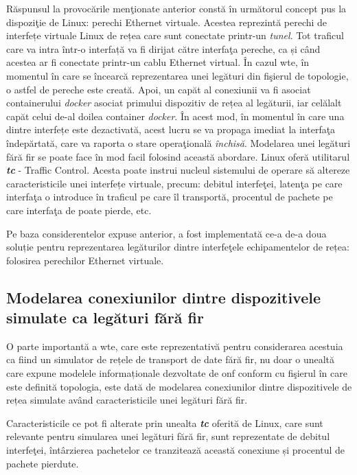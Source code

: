 Răspunsul la provocările menţionate anterior constă în următorul concept pus la dispoziţie de Linux: perechi Ethernet virtuale. Acestea reprezintă perechi de interfețe virtuale Linux de rețea care sunt conectate printr-un \textit{tunel}. Tot traficul care va intra într-o interfață va fi dirijat către interfaţa pereche, ca și când acestea ar fi conectate printr-un cablu Ethernet virtual. În cazul \gls{wte}, în momentul în care se încearcă reprezentarea unei legături din fişierul de topologie, o astfel de pereche este creată. Apoi, un capăt al conexiunii va fi asociat containerului \textit{docker} asociat primului dispozitiv de rețea al legăturii, iar celălalt capăt celui de-al doilea container \textit{docker}. În acest mod, în momentul în care una dintre interfețe este dezactivată, acest lucru se va propaga imediat la interfaţa îndepărtată, care va raporta o stare operaţională \textit{închisă}. Modelarea unei legături fără fir se poate face în mod facil folosind această abordare. Linux oferă utilitarul \textit{\textbf{tc}} - Traffic Control. Acesta poate instrui nucleul sistemului de operare să altereze caracteristicile unei interfețe virtuale, precum: debitul interfeţei, latenţa pe care interfaţa o introduce în traficul pe care îl transportă, procentul de pachete pe care interfaţa de poate pierde, etc.

Pe baza considerentelor expuse anterior, a fost implementată ce-a de-a doua soluție pentru reprezentarea legăturilor dintre interfeţele echipamentelor de rețea: folosirea perechilor Ethernet virtuale.

\subsection{Modelarea conexiunilor dintre dispozitivele simulate ca legături fără fir}

O parte importantă a \gls{wte}, care este reprezentativă pentru considerarea acestuia ca fiind un simulator de rețele de transport de date fără fir, nu doar o unealtă care expune modelele informaționale dezvoltate de \gls{onf} conform cu fişierul în care este definită topologia, este dată de modelarea conexiunilor dintre dispozitivele de rețea simulate având caracteristicile unei legături fără fir.

Caracteristicile ce pot fi alterate prin unealta \textit{\textbf{tc}} oferită de Linux, care sunt relevante pentru simularea unei legături fără fir, sunt reprezentate de debitul interfeţei, întârzierea pachetelor ce tranzitează această conexiune și procentul de pachete pierdute.

